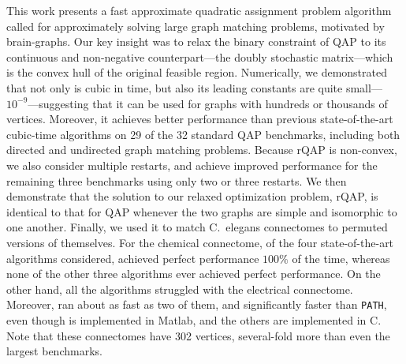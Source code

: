 \documentclass[10pt,journal,cspaper,compsoc]{IEEEtran}
\begin{document}
This work presents a fast approximate quadratic assignment problem algorithm called \FAQ for approximately solving large graph matching problems, motivated by brain-graphs.  Our key insight was to relax the binary constraint of QAP to its continuous and non-negative counterpart---the doubly stochastic matrix---which is the convex hull of the original feasible region.  
Numerically, we demonstrated that not only is \FAQ cubic in time, but also its leading constants are quite small---$10^{-9}$---suggesting that it can be used for graphs with hundreds or thousands of vertices.  Moreover, it achieves better performance than previous state-of-the-art cubic-time algorithms on 29 of the 32 standard QAP benchmarks, including both directed and undirected graph matching problems.  Because rQAP is non-convex, we also consider multiple restarts, and achieve improved performance for the remaining three benchmarks using only two or three restarts.  We then demonstrate that the solution to our relaxed optimization problem, rQAP, is identical to that for QAP whenever the two graphs are simple and isomorphic to one another.  Finally, we used it to match C.~elegans connectomes to permuted versions of themselves. For the chemical connectome, of the four state-of-the-art algorithms considered, \FAQ achieved perfect performance $100\%$ of the time, whereas none of the other three algorithms ever achieved perfect performance. On the other hand, all the algorithms struggled with the electrical connectome.   Moreover, \FAQ ran about as fast as two of them, and significantly faster than \texttt{PATH}, even though \FAQ is implemented in Matlab, and the others are implemented in C.  Note that these connectomes have 302 vertices, several-fold more than even the largest benchmarks. 



\end{document}
